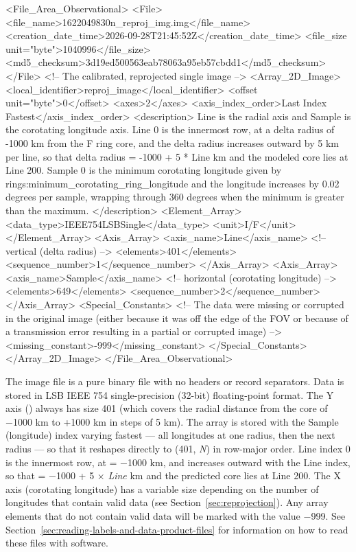\begin{CodeBlock}[fontsize=\scriptsize]
<File_Area_Observational>
    <File>
        <file_name>1622049830n_reproj_img.img</file_name>
        <creation_date_time>2026-09-28T21:45:52Z</creation_date_time>
        <file_size unit="byte">1040996</file_size>
        <md5_checksum>3d19ed500563eab78063a95eb57cbdd1</md5_checksum>
    </File>
    <!-- The calibrated, reprojected single image -->
    <Array_2D_Image>
        <local_identifier>reproj_image</local_identifier>
        <offset unit="byte">0</offset>
        <axes>2</axes>
        <axis_index_order>Last Index Fastest</axis_index_order>
        <description>
            Line is the radial axis and Sample is the corotating longitude axis.
            Line 0 is the innermost row, at a delta radius of -1000 km from the
            F ring core, and the delta radius increases outward by 5 km per line,
            so that delta radius = -1000 + 5 * Line km and the modeled core lies
            at Line 200. Sample 0 is the minimum corotating longitude given by
            rings:minimum_corotating_ring_longitude and the longitude increases
            by 0.02 degrees per sample, wrapping through 360 degrees when the
            minimum is greater than the maximum.
        </description>
        <Element_Array>
            <data_type>IEEE754LSBSingle</data_type>
            <unit>I/F</unit>
        </Element_Array>
        <Axis_Array>
            <axis_name>Line</axis_name> <!-- vertical (delta radius) -->
            <elements>401</elements>
            <sequence_number>1</sequence_number>
        </Axis_Array>
        <Axis_Array>
            <axis_name>Sample</axis_name> <!-- horizontal (corotating longitude) -->
            <elements>649</elements>
            <sequence_number>2</sequence_number>
        </Axis_Array>
        <Special_Constants>
            <!-- The data were missing or corrupted in the original image (either because it was off
             the edge of the FOV or because of a transmission error resulting in a partial or
             corrupted image) -->
            <missing_constant>-999</missing_constant>
        </Special_Constants>
    </Array_2D_Image>
</File_Area_Observational>
\end{CodeBlock}

The image file is a pure binary file with no headers or record separators. Data is stored in LSB IEEE 754 single-precision (32-bit) floating-point format. The Y axis (\dr{}) always has size 401 (which covers the radial distance from the core of −1000 km to +1000 km in steps of 5 km). The array is stored with the Sample (longitude) index varying fastest — all longitudes at one radius, then the next radius — so that it reshapes directly to (401, \textit{N}) in row-major order. Line index 0 is the innermost row, at \dr{} = −1000 km, and \dr{} increases outward with the Line index, so that \dr{} = −1000 + 5 × \textit{Line} km and the predicted core lies at Line 200. The X axis (corotating longitude) has a variable size depending on the number of longitudes that contain valid data (see Section~\ref{sec:reprojection}). Any array elements that do not contain valid data will be marked with the value −999. See Section~\ref{sec:reading-labels-and-data-product-files} for information on how to read these files with software.

